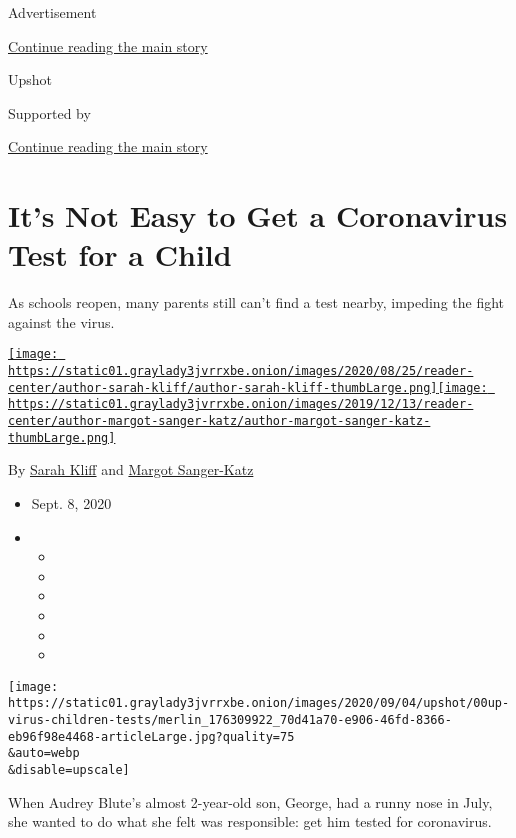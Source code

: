 Advertisement

\protect\hyperlink{after-top}{Continue reading the main story}

Upshot

Supported by

\protect\hyperlink{after-sponsor}{Continue reading the main story}

\hypertarget{its-not-easy-to-get-a-coronavirus-test-for-a-child}{%
\section{It's Not Easy to Get a Coronavirus Test for a
Child}\label{its-not-easy-to-get-a-coronavirus-test-for-a-child}}

As schools reopen, many parents still can't find a test nearby, impeding
the fight against the virus.

\href{https://www.nytimes3xbfgragh.onion/by/sarah-kliff}{\texttt{[image: https://static01.graylady3jvrrxbe.onion/images/2020/08/25/reader-center/author-sarah-kliff/author-sarah-kliff-thumbLarge.png]}}\href{https://www.nytimes3xbfgragh.onion/by/margot-sanger-katz}{\texttt{[image: https://static01.graylady3jvrrxbe.onion/images/2019/12/13/reader-center/author-margot-sanger-katz/author-margot-sanger-katz-thumbLarge.png]}}

By \href{https://www.nytimes3xbfgragh.onion/by/sarah-kliff}{Sarah Kliff}
and
\href{https://www.nytimes3xbfgragh.onion/by/margot-sanger-katz}{Margot
Sanger-Katz}

\begin{itemize}
\item
  Sept. 8, 2020
\item
  \begin{itemize}
  \item
  \item
  \item
  \item
  \item
  \item
  \end{itemize}
\end{itemize}

\texttt{[image: https://static01.graylady3jvrrxbe.onion/images/2020/09/04/upshot/00up-virus-children-tests/merlin\_176309922\_70d41a70-e906-46fd-8366-eb96f98e4468-articleLarge.jpg?quality=75\\\&auto=webp\\\&disable=upscale]}

When Audrey Blute's almost 2-year-old son, George, had a runny nose in
July, she wanted to do what she felt was responsible: get him tested for
coronavirus.

